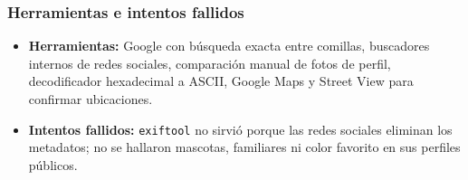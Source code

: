 \subsubsection{Herramientas e intentos fallidos}
\begin{itemize}
    \item \textbf{Herramientas:} Google con búsqueda exacta entre comillas, buscadores internos de redes sociales, comparación manual de fotos de perfil, decodificador hexadecimal a ASCII, Google Maps y Street View para confirmar ubicaciones.
    \item \textbf{Intentos fallidos:} \texttt{exiftool} no sirvió porque las redes sociales eliminan los metadatos; no se hallaron mascotas, familiares ni color favorito en sus perfiles públicos.
\end{itemize}

\clearpage
